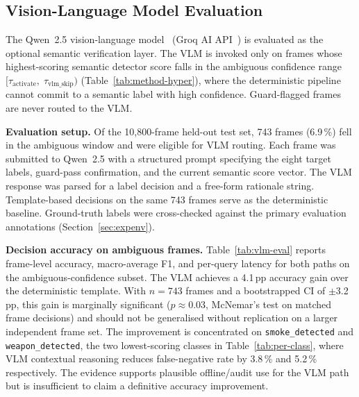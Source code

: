 \documentclass[sensors,article,submit,pdftex,moreauthors]{Definitions/mdpi}
\begin{document}
 
 
\subsection{Vision-Language Model Evaluation}
\label{sec:vlm-eval}
 
The Qwen~2.5 vision-language model~\cite{qwen25vl2025} (Groq AI API~\cite{groqapi2025}) is evaluated as the optional semantic verification layer. The VLM is invoked only on frames whose highest-scoring semantic detector score falls in the ambiguous confidence range $[\tau_{\text{activate}},\;\tau_{\text{vlm\_skip}})$ (Table~\ref{tab:method-hyper}), where the deterministic pipeline cannot commit to a semantic label with high confidence. Guard-flagged frames are never routed to the VLM.
 
\textbf{Evaluation setup.}
Of the 10{,}800-frame held-out test set, 743 frames (6.9\,\%) fell in the ambiguous window and were eligible for VLM routing. Each frame was submitted to Qwen~2.5 with a structured prompt specifying the eight target labels, guard-pass confirmation, and the current semantic score vector. The VLM response was parsed for a label decision and a free-form rationale string. Template-based decisions on the same 743 frames serve as the deterministic baseline. Ground-truth labels were cross-checked against the primary evaluation annotations (Section~\ref{sec:expenv}).
 
\textbf{Decision accuracy on ambiguous frames.}
Table~\ref{tab:vlm-eval} reports frame-level accuracy, macro-average F1, and per-query latency for both paths on the ambiguous-confidence subset. The VLM achieves a 4.1\,pp accuracy gain over the deterministic template. With $n{=}743$ frames and a bootstrapped CI of $\pm$3.2\,pp, this gain is marginally significant ($p{\approx}0.03$, McNemar's test on matched frame decisions) and should not be generalised without replication on a larger independent frame set. The improvement is concentrated on \texttt{smoke\_detected} and \texttt{weapon\_detected}, the two lowest-scoring classes in Table~\ref{tab:per-class}, where VLM contextual reasoning reduces false-negative rate by 3.8\,\% and 5.2\,\% respectively. The evidence supports plausible offline/audit use for the VLM path but is insufficient to claim a definitive accuracy improvement.
 
\end{document}

